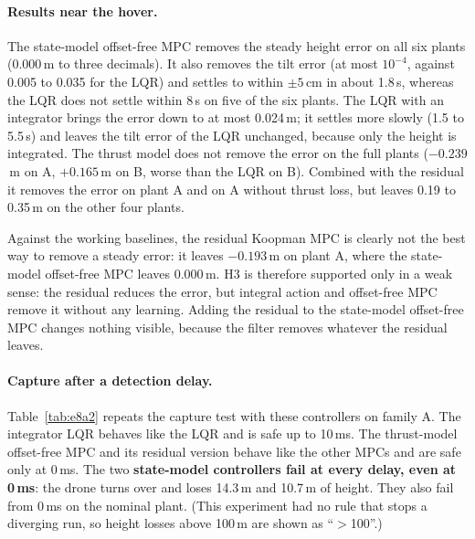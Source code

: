 \paragraph{Results near the hover.} The state-model offset-free MPC removes the steady height error on all six plants (0.000\,m to three decimals). It also removes the tilt error (at most $10^{-4}$, against 0.005 to 0.035 for the LQR) and settles to within $\pm5$\,cm in about 1.8\,s, whereas the LQR does not settle within 8\,s on five of the six plants. The LQR with an integrator brings the error down to at most 0.024\,m; it settles more slowly (1.5 to 5.5\,s) and leaves the tilt error of the LQR unchanged, because only the height is integrated. The thrust model does not remove the error on the full plants ($-0.239$\,m on A, $+0.165$\,m on B, worse than the LQR on B). Combined with the residual it removes the error on plant A and on A without thrust loss, but leaves 0.19 to 0.35\,m on the other four plants.

Against the working baselines, the residual Koopman MPC is clearly not the best way to remove a steady error: it leaves $-0.193$\,m on plant A, where the state-model offset-free MPC leaves 0.000\,m. H3 is therefore supported only in a weak sense: the residual reduces the error, but integral action and offset-free MPC remove it without any learning. Adding the residual to the state-model offset-free MPC changes nothing visible, because the filter removes whatever the residual leaves.

\paragraph{Capture after a detection delay.} Table~\ref{tab:e8a2} repeats the capture test with these controllers on family A. The integrator LQR behaves like the LQR and is safe up to 10\,ms. The thrust-model offset-free MPC and its residual version behave like the other MPCs and are safe only at 0\,ms. The two \textbf{state-model controllers fail at every delay, even at 0\,ms}: the drone turns over and loses 14.3\,m and 10.7\,m of height. They also fail from 0\,ms on the nominal plant. (This experiment had no rule that stops a diverging run, so height losses above 100\,m are shown as ``$>$100''.)

